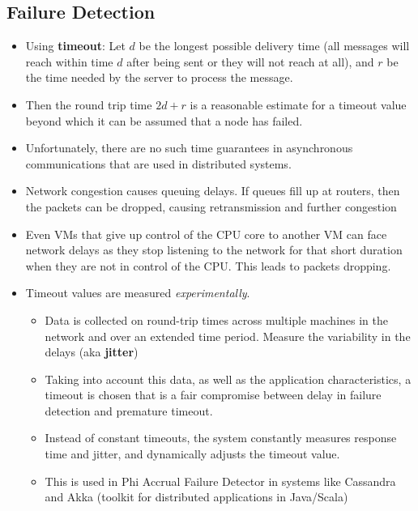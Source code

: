 \documentclass{article}
\begin{document}
\subsection{Failure Detection}
\begin{itemize}
    \item Using \textbf{timeout}: Let $d$ be the longest possible delivery time (all messages will reach within time $d$ after being sent or they will not reach at all), and $r$ be the time needed by the server to process the message. 
    
    \item Then the round trip time $2d+r$ is a reasonable estimate for a timeout value beyond which it can be assumed that a node has failed. 
    
    \item Unfortunately, there are no such time guarantees in asynchronous communications that are used in distributed systems. 
    
    \item Network congestion causes queuing delays. If queues fill up at routers, then the packets can be dropped, causing retransmission and further congestion
    
    \item Even VMs that give up control of the CPU core to another VM can face network delays as they stop listening to the network for that short duration when they are not in control of the CPU. This leads to packets dropping. 
    
    \item Timeout values are measured \textit{experimentally}. 
    \begin{itemize}
        \item Data is collected on round-trip times across multiple machines in the network and over an extended time period. Measure the variability in the delays (aka \textbf{jitter})
        
        \item Taking into account this data, as well as the application characteristics, a timeout is chosen that is a fair compromise between delay in failure detection and premature timeout.
        
        \item Instead of constant timeouts, the system constantly measures response time and jitter, and dynamically adjusts the timeout value.
        
        \item This is used in Phi Accrual Failure Detector in systems like Cassandra and Akka (toolkit for distributed applications in Java/Scala)
    \end{itemize}
    

\end{itemize}
\end{document}
